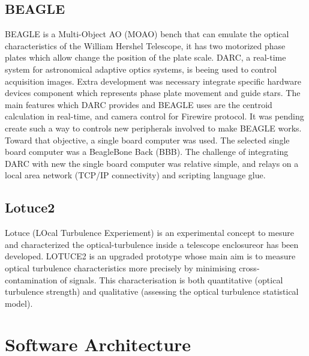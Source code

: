 \documentclass[]{spie}  %
\begin{document}
\subsection{BEAGLE}
BEAGLE is a Multi-Object AO (MOAO) bench that can emulate the optical
characteristics of the William Hershel Telescope, it has two motorized phase
plates which allow change the position of the plate scale. DARC, a real-time
system for astronomical adaptive optics systems, is beeing used to control
acquisition images. Extra development was necessary integrate specific hardware
devices component which represents phase plate movement and guide stars. The
main features which DARC provides and BEAGLE uses are the centroid calculation
in real-time\cite{basden2012wavefront}, and camera control for Firewire
protocol. It was pending create such a way to controls new peripherals involved
to make BEAGLE works. Toward that objective, a single board computer was used.
The selected single board computer was a BeagleBone Back (BBB). The challenge
of integrating DARC with new the single board computer was relative simple, and
relays on a local area network (TCP/IP connectivity) and scripting language
glue. 


\subsection{Lotuce2}
Lotuce (LOcal Turbulence Experiement)\cite{ziad1a2013lotuce} is an experimental
concept to mesure and characterized the optical-turbulence inside a telescope
enclosureor has been developed\cite{berdja1afirst}. LOTUCE2 is an upgraded
prototype whose main aim is to measure optical turbulence characteristics more
precisely by minimising cross-contamination of signals. This characterisation
is both quantitative (optical turbulence strength) and qualitative (assessing
the optical turbulence statistical model). 


\section{Software Architecture}\label{sec:SWA} 

\end{document}
